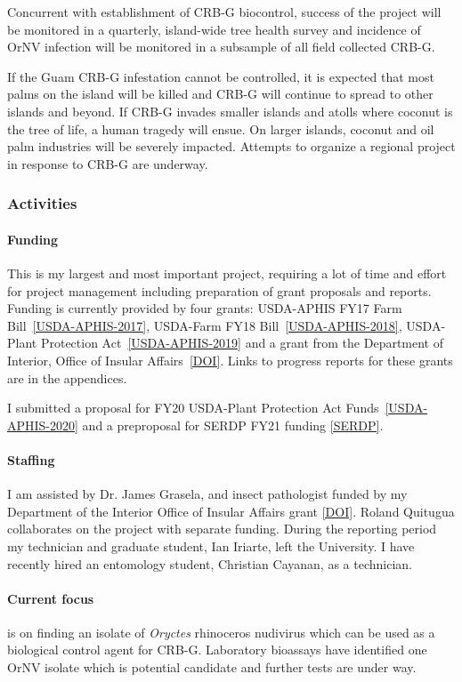 \begin{refsection}
Concurrent with establishment of CRB-G biocontrol, success of the
project will be monitored in a quarterly, island-wide tree health
survey and incidence of OrNV infection will be monitored in a subsample
of all field collected CRB-G.

If the Guam CRB-G infestation cannot be controlled, it is expected
that most palms on the island will be killed and CRB-G will continue
to spread to other islands and beyond. If CRB-G invades smaller islands
and atolls where coconut is the tree of life, a human tragedy will
ensue. On larger islands, coconut and oil palm industries will be
severely impacted. Attempts to organize a regional project in response
to CRB-G are underway.

\subsubsection{Activities}

\paragraph{Funding} This is my largest and most important project, requiring a lot of time and effort for project management including preparation of grant proposals and reports. Funding is currently provided by four grants: USDA-APHIS FY17 Farm Bill~\ref{USDA-APHIS-2017}, USDA-Farm FY18 Bill~\ref{USDA-APHIS-2018}, USDA-Plant Protection Act~\ref{USDA-APHIS-2019} and a grant from the Department of Interior, Office of Insular Affairs~\ref{DOI}. Links to progress reports for these grants are in the appendices. 

I submitted a proposal for FY20 USDA-Plant Protection Act Funds~\ref{USDA-APHIS-2020} and a preproposal for SERDP FY21 funding \ref{SERDP}. 

\paragraph{Staffing}

I am assisted by Dr. James Grasela, and insect pathologist funded by my Department of the Interior Office of Insular Affairs grant \ref{DOI}. Roland Quitugua collaborates on the project with separate funding.  During the reporting period my technician and graduate student, Ian Iriarte, left the University. I have recently hired an entomology student, Christian Cayanan, as a technician.

\paragraph{Current focus} is on finding an isolate of \textit{Oryctes} rhinoceros nudivirus which can be used as a biological control agent for CRB-G. Laboratory bioassays have identified one OrNV isolate which is potential candidate and further tests are under way.


\end{refsection}
